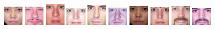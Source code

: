 \begin{figure}[H]
\centering

\includegraphics[width=0.09\textwidth]{img/fdResult1/output3.png}
\includegraphics[width=0.09\textwidth]{img/fdResult1/output4.png}
\includegraphics[width=0.09\textwidth]{img/fdResult1/output9.png}
\includegraphics[width=0.09\textwidth]{img/fdResult1/output12.png}
\includegraphics[width=0.09\textwidth]{img/fdResult1/output14.png}
\includegraphics[width=0.09\textwidth]{img/fdResult1/output15.png}
\includegraphics[width=0.09\textwidth]{img/fdResult1/output16.png}
\includegraphics[width=0.09\textwidth]{img/fdResult1/output17.png}
\includegraphics[width=0.09\textwidth]{img/fdResult1/output18.png}
\includegraphics[width=0.09\textwidth]{img/fdResult1/output27.png}

\end{figure}
